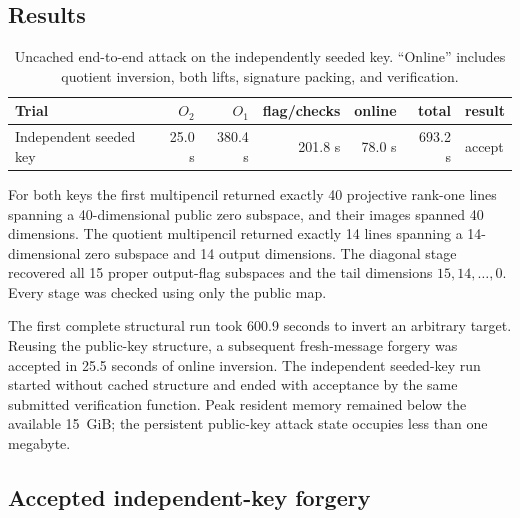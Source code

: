 \documentclass[11pt]{article}
\begin{document}
\subsection{Results}

\begin{table}[ht]
\centering
\caption{Uncached end-to-end attack on the independently seeded key.  ``Online''
includes quotient inversion, both lifts, signature packing, and verification.}
\label{tab:timings}
\footnotesize
\begin{tabular}{@{}p{29mm}rrrrrl@{}}
\toprule
Trial & $O_2$ & $O_1$ & flag/checks & online & total & result \\
\midrule
Independent seeded key & 25.0 s & 380.4 s & 201.8 s & 78.0 s & 693.2 s & accept \\
\bottomrule
\end{tabular}
\end{table}

For both keys the first multipencil returned exactly 40 projective rank-one
lines spanning a 40-dimensional public zero subspace, and their images spanned
40 dimensions.  The quotient multipencil returned exactly 14 lines spanning
a 14-dimensional zero subspace and 14 output dimensions.  The diagonal stage
recovered all 15 proper output-flag subspaces and the tail dimensions
$15,14,\ldots,0$.  Every stage was checked using only the public map.

The first complete structural run took 600.9 seconds to invert an arbitrary
target.  Reusing the public-key structure, a subsequent fresh-message forgery
was accepted in 25.5 seconds of online inversion.  The independent seeded-key
run started without cached structure and ended with acceptance by the same
submitted verification function.  Peak resident memory remained below the
available 15~GiB; the persistent public-key attack state occupies less than
one megabyte.

\subsection{Accepted independent-key forgery}
\end{document}
